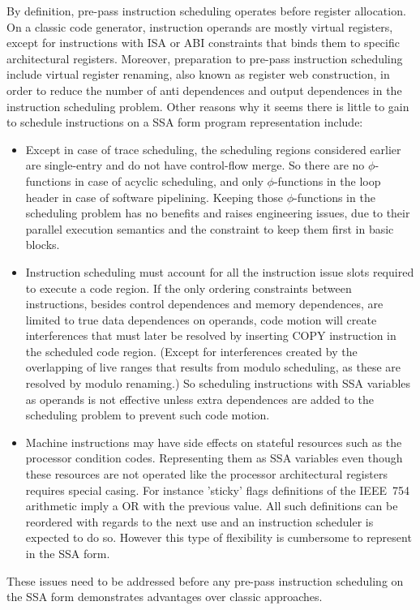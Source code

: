 By definition, pre-pass instruction scheduling operates before register
allocation. On a classic code generator, instruction operands are mostly virtual
registers, except for instructions with ISA or ABI constraints that binds them
to specific architectural registers. Moreover, preparation to pre-pass
instruction scheduling include virtual register renaming, also known as register
web construction, in order to reduce the number of anti dependences and output
dependences in the instruction scheduling problem. Other reasons why it seems
there is little to gain to schedule instructions on a SSA form program
representation include: \begin{itemize}

\item Except in case of trace scheduling, the scheduling regions considered
earlier are single-entry and do not have control-flow merge. So there are no
$\phi$-functions in case of acyclic scheduling, and only $\phi$-functions in the
loop header in case of software pipelining. Keeping those $\phi$-functions in
the scheduling problem has no benefits and raises engineering issues, due to
their parallel execution semantics and the constraint to keep them first in
basic blocks.

\item Instruction scheduling must account for all the instruction issue slots
required to execute a code region. If the only ordering constraints between
instructions, besides control dependences and memory dependences, are limited to
true data dependences on operands, code motion will create interferences that
must later be resolved by inserting COPY instruction in the scheduled code
region. (Except for interferences created by the overlapping of live ranges
that results from modulo scheduling, as these are resolved by modulo renaming.)
So scheduling instructions with SSA variables as operands is not effective
unless extra dependences are added to the scheduling problem to prevent such
code motion. 

\item Machine instructions may have side effects on stateful resources such as
the processor condition codes. Representing them as SSA variables even though
these resources are not operated like the processor architectural registers
requires special casing. For instance 'sticky' flags definitions of the IEEE~754
arithmetic imply a OR with the previous value. All such definitions can be
reordered with regards to the next use and an instruction scheduler is expected
to do so. However this type of flexibility is cumbersome to represent in the
SSA form.

\end{itemize} These issues need to be addressed before any pre-pass instruction
scheduling on the SSA form demonstrates advantages over classic approaches.
\medskip

